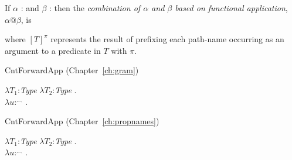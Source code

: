 If $\alpha$ :  
and $\beta$ : 
                         then the \textit{combination of $\alpha$ and
    $\beta$  based on functional application}, $\alpha\text{@}\beta$, is
\begin{quote}
\end{quote}
where $[T]^\pi$ represents the result of prefixing each path-name
occurring as an argument to a predicate in $T$ with $\pi$.

CntForwardApp (Chapter~\ref{ch:gram})

$\lambda T_1$:\textit{Type} $\lambda T_2$:\textit{Type} . \\
\hspace*{1em}$\lambda
u$:$^{\frown}$ . \\
\hspace*{2em}

CntForwardApp (Chapter~\ref{ch:propnames})

$\lambda T_1$:\textit{Type} $\lambda T_2$:\textit{Type} . \\
\hspace*{1em}$\lambda
u$:$^{\frown}$
    . \\
\hspace*{2em} 

